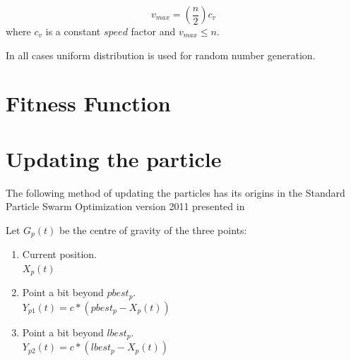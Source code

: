 \documentclass{mini}
\begin{document}
\begin{equation}
    v_{max} = (\frac{n}{2})c_{v}
\end{equation}
where $c_{v}$ is a constant $speed$ factor and $v_{max} \leq n$.

In all cases uniform distribution is used for random number generation.

\section{Fitness Function}\label{sec:fitness}

\section{Updating the particle}




%



The following method of updating the particles has its origins in the Standard Particle Swarm Optimization version 2011 presented in~\cite{pso_11}

Let $G_p(t)$ be the centre of gravity of the three points:
\begin{enumerate}
    \item Current position. \\
    $X_p(t)$
    
    \item Point a bit beyond $pbest_p$. \\
    $Y_{p1}(t) = c*(pbest_p-X_p(t))$
    
    \item Point a bit beyond $lbest_p$. \\
    $Y_{p2}(t) = c*(lbest_p-X_p(t))$
    
\end{enumerate}
\end{document}
